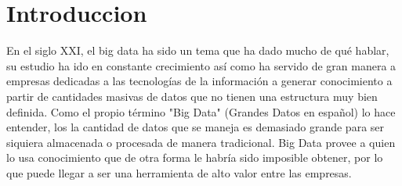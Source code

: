 \section{Introduccion}
En el siglo XXI, el big data ha sido un tema que ha dado mucho de qué hablar, su estudio ha ido en constante crecimiento así como ha servido de gran manera a empresas dedicadas a las tecnologías de la información a generar conocimiento a partir de cantidades masivas de datos que no tienen una estructura muy bien definida. Como el propio término "Big Data" (Grandes Datos en español) lo hace entender, los la cantidad de datos que se maneja es demasiado grande para ser siquiera almacenada o procesada de manera tradicional. Big Data provee a quien lo usa conocimiento que de otra forma le habría sido imposible obtener, por lo que puede llegar a ser una herramienta de alto valor entre las empresas.